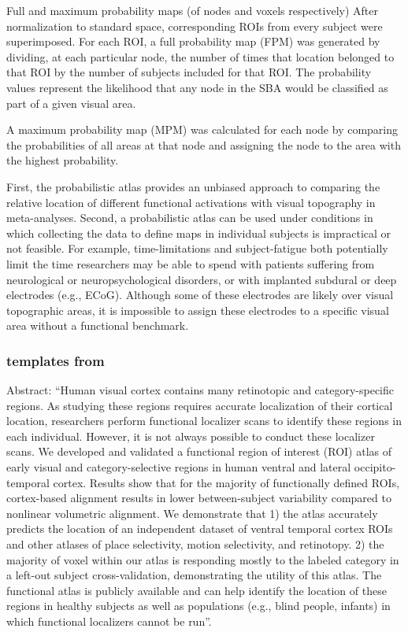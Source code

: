 Full and maximum probability maps (of nodes and voxels respectively)
%
After normalization to standard space, corresponding ROIs from every subject
were superimposed.
%
For each ROI, a full probability map (FPM) was generated by dividing, at each
particular node, the number of times that location belonged to that ROI by the
number of subjects included for that ROI.
%
The probability values represent the likelihood that any node in the SBA would
be classified as part of a given visual area.

%
A maximum probability map (MPM) was calculated for each node by comparing
the probabilities of all areas at that node and assigning the node to the area
with the highest probability.
%

First, the probabilistic atlas provides an unbiased approach to comparing the
relative location of different functional activations with visual topography in
meta-analyses.
%
Second, a probabilistic atlas can be used under conditions in which collecting
the data to define maps in individual subjects is impractical or not feasible.
%
For example, time-limitations and subject-fatigue both potentially limit the
time researchers may be able to spend with patients suffering from
neurological or neuropsychological disorders, or with implanted subdural or deep
electrodes (e.g., ECoG).
%
Although some of these electrodes are likely over visual topographic areas, it
is impossible to assign these electrodes to a specific visual area without a
functional benchmark.


\subsubsection{templates from \citet{rosenke2021probabilistic}}



Abstract: ``Human visual cortex contains many retinotopic and category-specific
regions.
%
As studying these regions requires accurate localization of their cortical
location, researchers perform functional localizer scans to identify these
regions in each individual.
%
However, it is not always possible to conduct these localizer scans.
%
We developed and validated a functional region of interest (ROI) atlas of early
visual and category-selective regions in human ventral and lateral
occipito-temporal cortex.
%
Results show that for the majority of functionally defined ROIs, cortex-based
alignment results in lower between-subject variability compared to nonlinear
volumetric alignment.
%
We demonstrate that
%
1) the atlas accurately predicts the location of an independent dataset of
ventral temporal cortex ROIs and other atlases of place selectivity, motion
selectivity, and retinotopy.
%
2) the majority of voxel within our atlas is responding mostly to the labeled
category in a left-out subject cross-validation, demonstrating the utility of
this atlas.
%
The functional atlas is publicly available and can help identify the location of
these regions in healthy subjects as well as populations (e.g., blind people,
infants) in which functional localizers cannot be run''.

